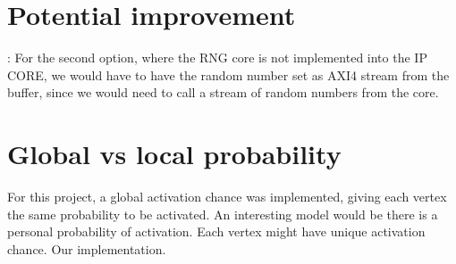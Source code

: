 \section{Potential improvement}:
For the second option, where the RNG core is not implemented into the IP CORE, we would have to have the random number set as AXI4 stream from the buffer, since we would need to call a stream of random numbers from the core.


\section{Global vs local probability}
For this project, a global activation chance was implemented, giving each vertex the same probability to be activated. An interesting model would be there is a personal probability of activation. Each vertex might have unique activation chance. Our implementation. 
